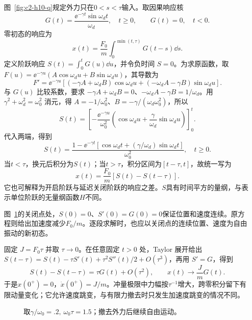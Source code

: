 \begin{solution}
图~\ref{fig:c2-h10-q}规定外力只在$0<s<\tau$输入。取因果响应核
\[G(t)=\frac{\ee^{-\gamma t}\sin\omega_dt}{\omega_d},\quad t\ge0,
\qquad G(t)=0,\quad t<0.\]
零初态的响应为
\[x(t)=\frac{F_0}{m}\int_0^{\min(t,\tau)}G(t-s)\dd s.\]
定义阶跃响应 $S(t)=\int_0^tG(u)\dd u$，并令负时间 $S=0$。为求原函数，取 $F(u)=\ee^{-\gamma u}(A\cos\omega_du+B\sin\omega_du)$，其导数为
\[
F'=\ee^{-\gamma u}[(-\gamma A+\omega_dB)\cos\omega_du
+(-\omega_dA-\gamma B)\sin\omega_du].
\]
与 $G(u)$ 比较系数，要求 $-\gamma A+\omega_dB=0$、$-\omega_dA-\gamma B=1/\omega_d$。用 $\gamma^2+\omega_d^2=\omega_0^2$ 消元，得 $A=-1/\omega_0^2$、$B=-\gamma/(\omega_d\omega_0^2)$，所以
\[
S(t)=\left[-\frac{\ee^{-\gamma u}}{\omega_0^2}
\left(\cos\omega_du+\frac\gamma{\omega_d}\sin\omega_du\right)\right]_0^t.
\]
代入两端，得到
\[S(t)=\frac{1-\ee^{-\gamma t}[\cos\omega_dt+(\gamma/\omega_d)\sin\omega_dt]}{\omega_0^2},\quad t\ge0.\]
当$t<\tau$，换元后积分为$S(t)$；当$t>\tau$，积分区间为$[t-\tau,t]$，故统一写为
\[\boxed{x(t)=\frac{F_0}{m}[S(t)-S(t-\tau)]}.\]
它也可解释为开启阶跃与延迟关闭阶跃的响应之差。$S$具有时间平方的量纲，与表示单位阶跃的无量纲函数$H$不同。

图~\ref{fig:c2-h10-s}的关闭点处，$S(0)=0$、$S'(0)=G(0)=0$保证位置和速度连续。原方程则给出加速度减少$F_0/m$。逐段求解时，也应以关闭点的连续位置、速度为自由振动的新初态。

固定 $J=F_0\tau$ 并取 $\tau\to0$。在任意固定 $t>0$ 处，Taylor 展开给出 $S(t-\tau)=S(t)-\tau S'(t)+\tau^2S''(t)/2+O(\tau^3)$，再用 $S'=G$，得到
\[S(t)-S(t-\tau)=\tau G(t)+O(\tau^2),\qquad
\boxed{x(t)\longrightarrow\frac JmG(t)}.\]
于是$x(0^+)=0$，$\dot x(0^+)=J/m$。冲量极限中力幅按$\tau^{-1}$增大，跨零积分留下有限动量变化；它允许速度跳变，与有限力撤去时只发生加速度跳变的情况不同。

\begin{figure}[H]\centering
{}
\caption{取$\gamma/\omega_0=.2,\ \omega_0\tau=1.5$；撤去外力后继续自由运动。}\label{fig:c2-h10-s}
\end{figure}
\end{solution}

